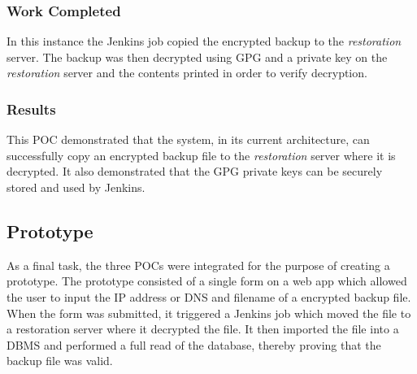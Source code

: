   \subsubsection{Work Completed}
	In this instance the Jenkins job copied the encrypted backup to the \textit{restoration} server. The backup was then decrypted using GPG and a private key on the \textit{restoration} server and the contents printed in order to verify decryption. 
	
  \subsubsection{Results}
  This POC demonstrated that the system, in its current architecture, can successfully copy an encrypted backup file to the \textit{restoration} server where it is decrypted. It also demonstrated that the GPG private keys can be securely stored and used by Jenkins.

  \subsection{Prototype}
  As a final task, the three POCs were integrated for the purpose of creating a prototype. The prototype consisted of a single form on a web app which allowed the user to input the IP address or DNS and filename of a encrypted backup file. When the form was submitted, it triggered a Jenkins job which moved the file to a restoration server where it decrypted the file. It then imported the file into a DBMS and performed a full read of the database, thereby proving that the backup file was valid.

